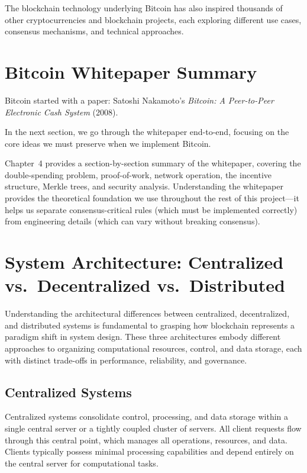 The blockchain technology underlying Bitcoin has also inspired thousands of other cryptocurrencies and blockchain projects, each exploring different use cases, consensus mechanisms, and technical approaches.

\section{Bitcoin Whitepaper Summary}
\label{sec:whitepaper-summary}

Bitcoin started with a paper: Satoshi Nakamoto's \textit{Bitcoin: A Peer-to-Peer Electronic Cash System} (2008).

In the next section, we go through the whitepaper end-to-end, focusing on the core ideas we must preserve when we implement Bitcoin.

Chapter~4 provides a section-by-section summary of the whitepaper, covering the double-spending problem, proof-of-work, network operation, the incentive structure, Merkle trees, and security analysis. Understanding the whitepaper provides the theoretical foundation we use throughout the rest of this project---it helps us separate consensus-critical rules (which must be implemented correctly) from engineering details (which can vary without breaking consensus).

\section{System Architecture: Centralized vs.\ Decentralized vs.\ Distributed}
\label{sec:ch02-system-architecture}

Understanding the architectural differences between centralized, decentralized, and distributed systems is fundamental to grasping how blockchain represents a paradigm shift in system design. These three architectures embody different approaches to organizing computational resources, control, and data storage, each with distinct trade-offs in performance, reliability, and governance.

\subsection{Centralized Systems}
\label{subsec:centralized}

Centralized systems consolidate control, processing, and data storage within a single central server or a tightly coupled cluster of servers. All client requests flow through this central point, which manages all operations, resources, and data. Clients typically possess minimal processing capabilities and depend entirely on the central server for computational tasks.

